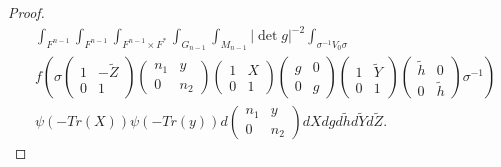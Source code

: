 \documentclass{amsart}
\begin{document}
\begin{proof}
\begin{equation}
\begin{split}
&\int_{F^{n-1}} \int_{F^{n-1}} \int_{F^{n-1} \times F^*} \int_{G_{n-1}} \int_{M_{n-1}}  |\det g|^{-2}\int_{\sigma^{-1} V_0 \sigma} \\
& f\left(\sigma \begin{pmatrix}
1 & -\widetilde{Z} \\
0 & 1
\end{pmatrix}  \begin{pmatrix}
n_1 & y \\
0 & n_2
\end{pmatrix} \begin{pmatrix}
1 & X \\
0 & 1
\end{pmatrix} \begin{pmatrix}
g & 0 \\
0 & g
\end{pmatrix} \begin{pmatrix}
1 & \widetilde{Y} \\
0 & 1
\end{pmatrix}\begin{pmatrix}
\widetilde{h} & 0 \\
0 & \widetilde{h}
\end{pmatrix} \sigma^{-1} \right)  \\
& \psi(-Tr(X)) \psi(-Tr(y)) d\begin{pmatrix}
n_1 & y \\
0 & n_2
\end{pmatrix} dX dg d\widetilde{h} d\widetilde{Y} d\widetilde{Z}.
\end{split}
\end{equation}


\end{proof}
\end{document}
